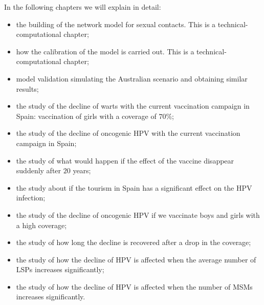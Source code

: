 In the following chapters we will explain in detail: 
\begin{itemize}
	\item the building of the network model for sexual contacts. This is a technical-computational chapter;
	\item how the calibration of the model is carried out. This is a technical-computational chapter;
	\item model validation simulating the Australian scenario and obtaining similar results;
	\item the study of the decline of warts with the current vaccination campaign in Spain: vaccination of girls with a coverage of $70\%$;
	\item the study of the decline of oncogenic HPV with the current vaccination campaign in Spain;
	\item the study of what would happen if the effect of the vaccine disappear suddenly after $20$ years;
	\item the study about if the tourism in Spain has a significant effect on the HPV infection;
	\item the study of the decline of oncogenic HPV if we vaccinate boys and girls with a high coverage;
	\item the study of how long the decline is recovered after a drop in the coverage;
	\item the study of how the decline of HPV is affected when the average number of LSPs increases significantly;
	\item the study of how the decline of HPV is affected when the number of MSMs increases significantly.
\end{itemize}


